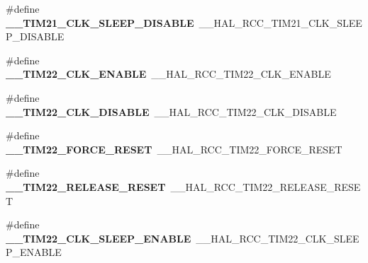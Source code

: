 \begin{DoxyCompactItemize}
\item 
\hypertarget{group___h_a_l___r_c_c___aliased_ga2079771896a6ffc761933edb8bcaaa11}{\#define {\bfseries \-\_\-\-\_\-\-T\-I\-M21\-\_\-\-C\-L\-K\-\_\-\-S\-L\-E\-E\-P\-\_\-\-D\-I\-S\-A\-B\-L\-E}~\-\_\-\-\_\-\-H\-A\-L\-\_\-\-R\-C\-C\-\_\-\-T\-I\-M21\-\_\-\-C\-L\-K\-\_\-\-S\-L\-E\-E\-P\-\_\-\-D\-I\-S\-A\-B\-L\-E}\label{group___h_a_l___r_c_c___aliased_ga2079771896a6ffc761933edb8bcaaa11}

\item 
\hypertarget{group___h_a_l___r_c_c___aliased_ga1cb31ba98237a6cf0ef42a744cb85492}{\#define {\bfseries \-\_\-\-\_\-\-T\-I\-M22\-\_\-\-C\-L\-K\-\_\-\-E\-N\-A\-B\-L\-E}~\-\_\-\-\_\-\-H\-A\-L\-\_\-\-R\-C\-C\-\_\-\-T\-I\-M22\-\_\-\-C\-L\-K\-\_\-\-E\-N\-A\-B\-L\-E}\label{group___h_a_l___r_c_c___aliased_ga1cb31ba98237a6cf0ef42a744cb85492}

\item 
\hypertarget{group___h_a_l___r_c_c___aliased_ga866ebd9a0fc9021e63853457d20b24da}{\#define {\bfseries \-\_\-\-\_\-\-T\-I\-M22\-\_\-\-C\-L\-K\-\_\-\-D\-I\-S\-A\-B\-L\-E}~\-\_\-\-\_\-\-H\-A\-L\-\_\-\-R\-C\-C\-\_\-\-T\-I\-M22\-\_\-\-C\-L\-K\-\_\-\-D\-I\-S\-A\-B\-L\-E}\label{group___h_a_l___r_c_c___aliased_ga866ebd9a0fc9021e63853457d20b24da}

\item 
\hypertarget{group___h_a_l___r_c_c___aliased_ga3366750cb7794db4d1d46dd8d968038d}{\#define {\bfseries \-\_\-\-\_\-\-T\-I\-M22\-\_\-\-F\-O\-R\-C\-E\-\_\-\-R\-E\-S\-E\-T}~\-\_\-\-\_\-\-H\-A\-L\-\_\-\-R\-C\-C\-\_\-\-T\-I\-M22\-\_\-\-F\-O\-R\-C\-E\-\_\-\-R\-E\-S\-E\-T}\label{group___h_a_l___r_c_c___aliased_ga3366750cb7794db4d1d46dd8d968038d}

\item 
\hypertarget{group___h_a_l___r_c_c___aliased_ga1519bba7d69761e2198845ce7697a92b}{\#define {\bfseries \-\_\-\-\_\-\-T\-I\-M22\-\_\-\-R\-E\-L\-E\-A\-S\-E\-\_\-\-R\-E\-S\-E\-T}~\-\_\-\-\_\-\-H\-A\-L\-\_\-\-R\-C\-C\-\_\-\-T\-I\-M22\-\_\-\-R\-E\-L\-E\-A\-S\-E\-\_\-\-R\-E\-S\-E\-T}\label{group___h_a_l___r_c_c___aliased_ga1519bba7d69761e2198845ce7697a92b}

\item 
\hypertarget{group___h_a_l___r_c_c___aliased_ga97b8627f8f78a55d70a6c50241c43a2f}{\#define {\bfseries \-\_\-\-\_\-\-T\-I\-M22\-\_\-\-C\-L\-K\-\_\-\-S\-L\-E\-E\-P\-\_\-\-E\-N\-A\-B\-L\-E}~\-\_\-\-\_\-\-H\-A\-L\-\_\-\-R\-C\-C\-\_\-\-T\-I\-M22\-\_\-\-C\-L\-K\-\_\-\-S\-L\-E\-E\-P\-\_\-\-E\-N\-A\-B\-L\-E}\label{group___h_a_l___r_c_c___aliased_ga97b8627f8f78a55d70a6c50241c43a2f}


\end{DoxyCompactItemize}
